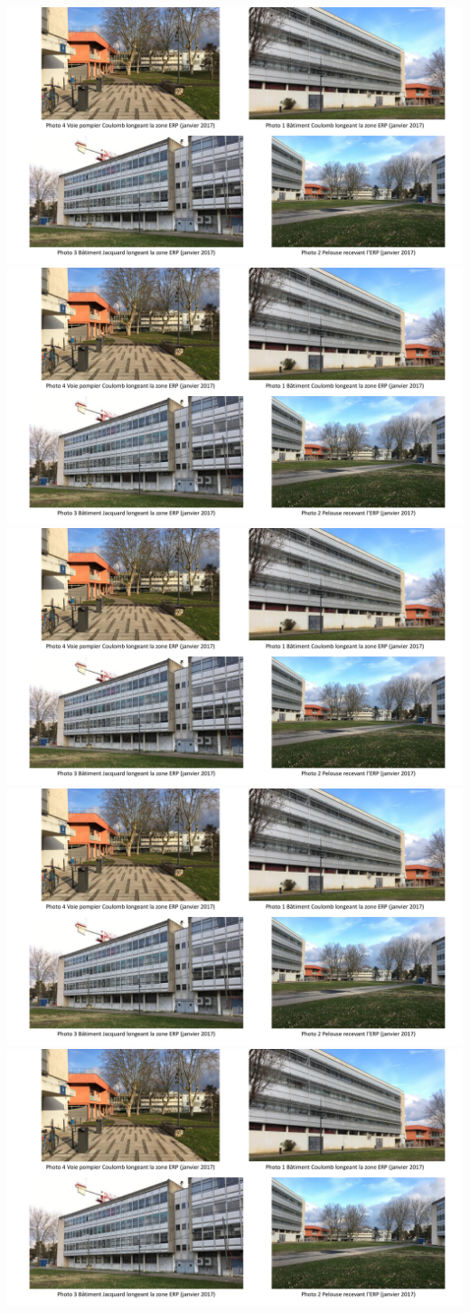 \documentclass[hidelinks, paper=a4, fontsize=13pt]{report}
\begin{document}
\begin{center}
	\includegraphics[angle=90,width=.7\textwidth,keepaspectratio, page = 1]{Annexes/Exports/Photos_zone}
	\includegraphics[angle=90,width=.7\textwidth,keepaspectratio, page = 2]{Annexes/Exports/Photos_zone}
	\includegraphics[angle=90,width=.7\textwidth,keepaspectratio, page = 3]{Annexes/Exports/Photos_zone}
	\includegraphics[angle=90,width=.7\textwidth,keepaspectratio, page = 4]{Annexes/Exports/Photos_zone}
	\includegraphics[angle=90,width=.7\textwidth,keepaspectratio, page = 5]{Annexes/Exports/Photos_zone}
\end{center}
\end{document}
